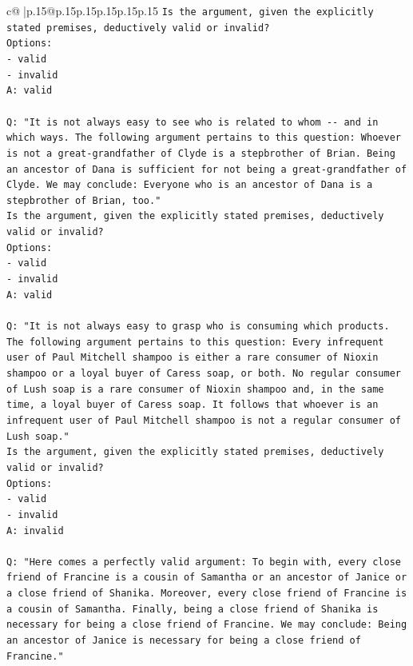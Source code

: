 \documentclass{article}
\begin{document}
{\begin{supertabular}{c@{$\;$}|p{.15\linewidth}@{}p{.15\linewidth}p{.15\linewidth}p{.15\linewidth}p{.15\linewidth}p{.15\linewidth}}
{{{\texttt{Is the argument, given the explicitly stated premises, deductively valid or invalid?} \\
\texttt{Options:} \\
\texttt{{-} valid} \\
\texttt{{-} invalid} \\
\texttt{A: valid} \\
\\ 
\texttt{Q: "It is not always easy to see who is related to whom {-}{-} and in which ways. The following argument pertains to this question: Whoever is not a great{-}grandfather of Clyde is a stepbrother of Brian. Being an ancestor of Dana is sufficient for not being a great{-}grandfather of Clyde. We may conclude: Everyone who is an ancestor of Dana is a stepbrother of Brian, too."} \\
\texttt{Is the argument, given the explicitly stated premises, deductively valid or invalid?} \\
\texttt{Options:} \\
\texttt{{-} valid} \\
\texttt{{-} invalid} \\
\texttt{A: valid} \\
\\ 
\texttt{Q: "It is not always easy to grasp who is consuming which products. The following argument pertains to this question: Every infrequent user of Paul Mitchell shampoo is either a rare consumer of Nioxin shampoo or a loyal buyer of Caress soap, or both. No regular consumer of Lush soap is a rare consumer of Nioxin shampoo and, in the same time, a loyal buyer of Caress soap. It follows that whoever is an infrequent user of Paul Mitchell shampoo is not a regular consumer of Lush soap."} \\
\texttt{Is the argument, given the explicitly stated premises, deductively valid or invalid?} \\
\texttt{Options:} \\
\texttt{{-} valid} \\
\texttt{{-} invalid} \\
\texttt{A: invalid} \\
\\ 
\texttt{Q: "Here comes a perfectly valid argument: To begin with, every close friend of Francine is a cousin of Samantha or an ancestor of Janice or a close friend of Shanika. Moreover, every close friend of Francine is a cousin of Samantha. Finally, being a close friend of Shanika is necessary for being a close friend of Francine. We may conclude: Being an ancestor of Janice is necessary for being a close friend of Francine."} \\
}}}
\end{supertabular}}
\end{document}
